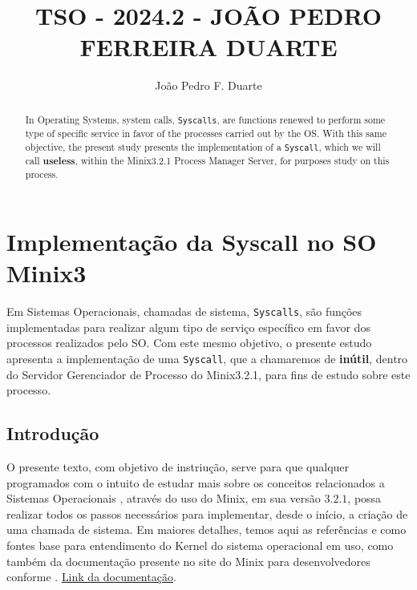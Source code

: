 \documentclass[12pt]{article}
\title{TSO - 2024.2 - JOÃO PEDRO FERREIRA DUARTE}
\author{João Pedro F. Duarte\inst{1} }
\begin{document}
 

\maketitle

\section{Implementação da Syscall no SO Minix3}

\begin{abstract}
    In Operating Systems, system calls, \texttt{Syscalls}, are functions renewed to perform some type of specific service in favor of the processes carried out by the OS.
    With this same objective, the present study presents the implementation of a \texttt{Syscall}, which we will call \textbf{useless}, within the Minix3.2.1 Process Manager Server, for purposes
    study on this process.
\end{abstract}
     
\begin{resumo}
Em Sistemas Operacionais, chamadas de sistema, \texttt{Syscalls}, são funções implementadas para realizar algum tipo de serviço específico em favor dos processos realizados
pelo SO. Com este mesmo objetivo, o presente estudo apresenta a implementação de uma \texttt{Syscall}, que a chamaremos de \textbf{inútil}, dentro do Servidor Gerenciador de
Processo do Minix3.2.1, para fins de estudo sobre este processo.
\end{resumo}


\subsection{Introdução} %

O presente texto, com objetivo de instriução, serve para que qualquer programados com o intuito de estudar mais sobre os conceitos relacionados a Sistemas Operacionais
, através do uso do Minix, em sua versão $3.2.1$, possa realizar todos os passos necessários para implementar, desde o início, a criação de uma chamada de sistema. Em
maiores detalhes, temos aqui as referências \cite{creating_syscall} e \cite{tanenbaum_modern_os} como fontes base para entendimento do Kernel do sistema operacional em uso,
como também da documentação presente no site do Minix para desenvolvedores conforme \cite{minix3docs}. \href{https://www.minix3.org/doc/}{Link da documentação}.
%
\end{document}
